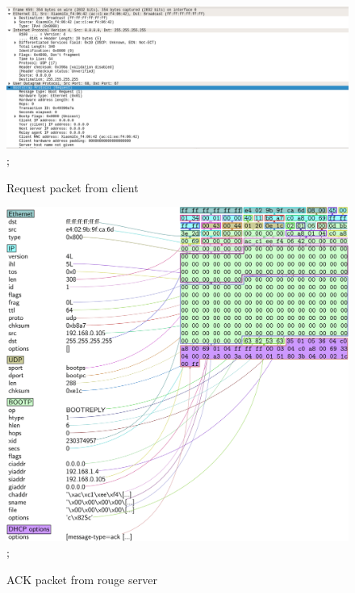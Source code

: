 \documentclass[12pt]{article}
\begin{document}
\begin{sloppypar}
    \begin{figure}[h!]
    \centering
    \includegraphics[width=15 cm,height=9 cm]{images/request2-2.png};
    \caption{Request packet from client}
    \end{figure}
    
    
    
    \newpage
    \begin{figure}[h]
    \centering
    \includegraphics[width=12 cm,height=13 cm]{images/ack-1.png};
    \caption{ACK packet from rouge server}
    \end{figure}
       

\end{sloppypar}
\end{document}
